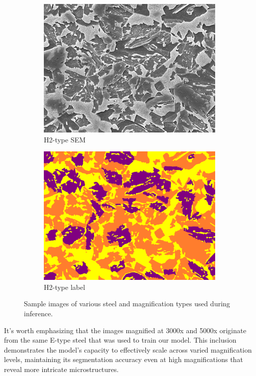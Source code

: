 \documentclass[]{article}
\begin{document}
\begin{figure}[ht]
	\begin{subfigure}[b]{0.2\textwidth}
		\centering
		\includegraphics[width=\textwidth]{images/H2-type/1.png}
		\caption{H2-type SEM}
		\label{fig:image2.5.1}
	\end{subfigure}
	\begin{subfigure}[b]{0.2\textwidth}
		\centering
		\includegraphics[width=\textwidth]{images/H2-type/1_label.png}
		\caption{H2-type label}
		\label{fig:image2.5.2}
	\end{subfigure}
	\caption{Sample images of various steel and magnification types used during inference.}
	\label{fig:combined}
\end{figure}

It's worth emphasizing that the images magnified at 3000x and 5000x originate from the same E-type steel that was used to train our model. This inclusion demonstrates the model's capacity to effectively scale across varied magnification levels, maintaining its segmentation accuracy even at high magnifications that reveal more intricate microstructures.
\end{document}
